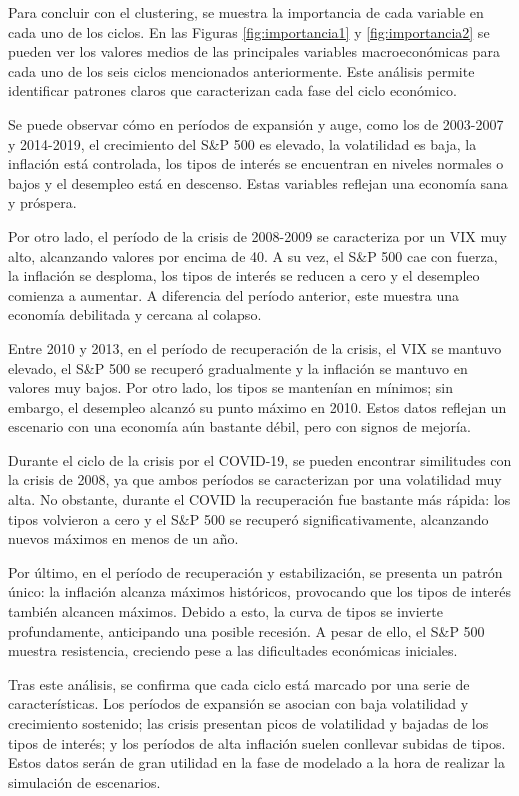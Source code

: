 Para concluir con el clustering, se muestra la importancia de cada variable en cada uno de los ciclos. En las Figuras \ref{fig:importancia1} y \ref{fig:importancia2} se pueden ver los valores medios de las principales variables macroeconómicas para cada uno de los seis ciclos mencionados anteriormente. Este análisis permite identificar patrones claros que caracterizan cada fase del ciclo económico.

Se puede observar cómo en períodos de expansión y auge, como los de 2003-2007 y 2014-2019, el crecimiento del S\&P 500 es elevado, la volatilidad es baja, la inflación está controlada, los tipos de interés se encuentran en niveles normales o bajos y el desempleo está en descenso. Estas variables reflejan una economía sana y próspera.

Por otro lado, el período de la crisis de 2008-2009 se caracteriza por un VIX muy alto, alcanzando valores por encima de 40. A su vez, el S\&P 500 cae con fuerza, la inflación se desploma, los tipos de interés se reducen a cero y el desempleo comienza a aumentar. A diferencia del período anterior, este muestra una economía debilitada y cercana al colapso.

Entre 2010 y 2013, en el período de recuperación de la crisis, el VIX se mantuvo elevado, el S\&P 500 se recuperó gradualmente y la inflación se mantuvo en valores muy bajos. Por otro lado, los tipos se mantenían en mínimos; sin embargo, el desempleo alcanzó su punto máximo en 2010. Estos datos reflejan un escenario con una economía aún bastante débil, pero con signos de mejoría.

Durante el ciclo de la crisis por el COVID-19, se pueden encontrar similitudes con la crisis de 2008, ya que ambos períodos se caracterizan por una volatilidad muy alta. No obstante, durante el COVID la recuperación fue bastante más rápida: los tipos volvieron a cero y el S\&P 500 se recuperó significativamente, alcanzando nuevos máximos en menos de un año.

Por último, en el período de recuperación y estabilización, se presenta un patrón único: la inflación alcanza máximos históricos, provocando que los tipos de interés también alcancen máximos. Debido a esto, la curva de tipos se invierte profundamente, anticipando una posible recesión. A pesar de ello, el S\&P 500 muestra resistencia, creciendo pese a las dificultades económicas iniciales.

Tras este análisis, se confirma que cada ciclo está marcado por una serie de características. Los períodos de expansión se asocian con baja volatilidad y crecimiento sostenido; las crisis presentan picos de volatilidad y bajadas de los tipos de interés; y los períodos de alta inflación suelen conllevar subidas de tipos. Estos datos serán de gran utilidad en la fase de modelado a la hora de realizar la simulación de escenarios.

